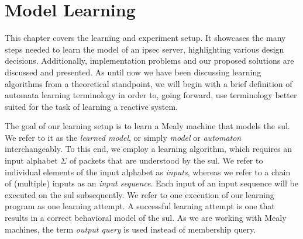 %
%
% 

\chapter{Model Learning}

\label{chap:Learning}

This chapter covers the learning and experiment setup. It showcases the many steps needed to learn the model of an \ac{ipsec} server, highlighting various design decisions. Additionally, implementation problems and our proposed solutions are discussed and presented. As until now we have been discussing learning algorithms from a theoretical standpoint, we will begin with a brief definition of automata learning terminology in order to, going forward, use terminology better suited for the task of learning a reactive system. 

The goal of our learning setup is to learn a Mealy machine that models the \ac{sul}. We refer to it as the \textit{learned model}, or simply \textit{model} or \textit{automaton} interchangeably. To this end, we employ a learning algorithm, which requires an input alphabet $\Sigma$ of packets that are understood by the \ac{sul}. We refer to individual elements of the input alphabet as \textit{inputs}, whereas we refer to a chain of (multiple) inputs as an \textit{input sequence}. Each input of an input sequence will be executed on the \ac{sul} subsequently. We refer to one execution of our learning program as one learning attempt. A successful learning attempt is one that results in a correct behavioral model of the \ac{sul}. As we are working with Mealy machines, the term \textit{output query} is used instead of membership query.

